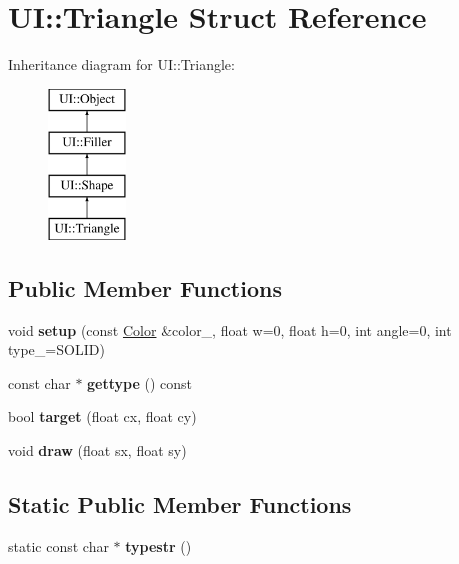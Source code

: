\hypertarget{struct_u_i_1_1_triangle}{}\section{UI\+:\+:Triangle Struct Reference}
\label{struct_u_i_1_1_triangle}
Inheritance diagram for UI\+:\+:Triangle\+:\begin{figure}[H]
\begin{center}
\leavevmode
\includegraphics[height=4.000000cm]{struct_u_i_1_1_triangle}
\end{center}
\end{figure}
\subsection*{Public Member Functions}
\begin{DoxyCompactItemize}
\item 
\mbox{\label{struct_u_i_1_1_triangle_ac510d0db089be32481d40e67d1aac7c1}} 
void {\bfseries setup} (const \hyperlink{struct_u_i_1_1_color}{Color} \&color\+\_\+, float w=0, float h=0, int angle=0, int type\+\_\+=S\+O\+L\+ID)
\item 
\mbox{\label{struct_u_i_1_1_triangle_a68a550de904ddf42b470d8e86c5e7bd7}} 
const char $\ast$ {\bfseries gettype} () const
\item 
\mbox{\label{struct_u_i_1_1_triangle_a703e60645d9f053ce41410374f33ed84}} 
bool {\bfseries target} (float cx, float cy)
\item 
\mbox{\label{struct_u_i_1_1_triangle_a3ca7d17f2d08f83ad42c270a29f78bae}} 
void {\bfseries draw} (float sx, float sy)
\end{DoxyCompactItemize}
\subsection*{Static Public Member Functions}
\begin{DoxyCompactItemize}
\item 
\mbox{\label{struct_u_i_1_1_triangle_a43b6069c8c2b1dcd891a5267735bd767}} 
static const char $\ast$ {\bfseries typestr} ()
\end{DoxyCompactItemize}
